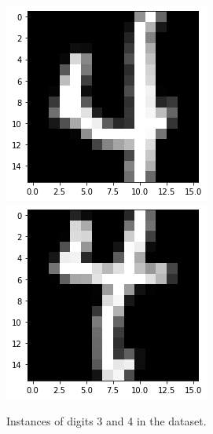 \documentclass[a4paper,10pt]{report}
\begin{document}
\begin{figure}[!htb]
  \endminipage\hfill
  \includegraphics[width=\linewidth]{4_1.png}
  \endminipage\hfill
  \includegraphics[width=\linewidth]{4_2.png}
  \endminipage\hfill
  \caption{Instances of digits 3 and 4 in the dataset.}
  \label{fig:3_4_instances}
\end{figure}
\end{document}
